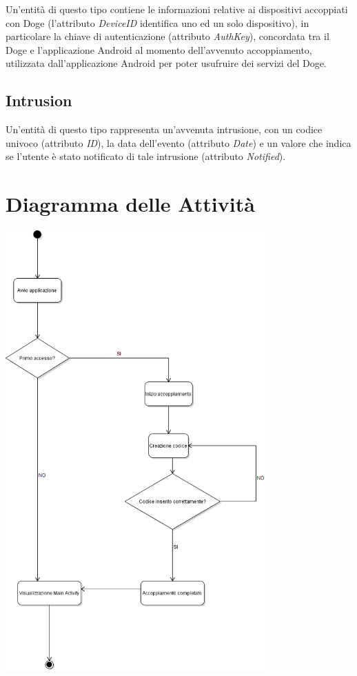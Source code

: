 \documentclass{article}
\begin{document}
Un'entità di questo tipo contiene le informazioni relative ai dispositivi accoppiati con Doge (l'attributo \textit{DeviceID} identifica uno ed un solo dispositivo), in particolare la chiave di autenticazione (attributo \textit{AuthKey}), concordata tra il Doge e l'applicazione Android al momento dell'avvenuto accoppiamento, utilizzata dall'applicazione Android per poter usufruire dei servizi del Doge.

\subsection{Intrusion}

Un'entità di questo tipo rappresenta un'avvenuta intrusione, con un codice univoco (attributo \textit{ID}), la data dell'evento (attributo \textit{Date}) e un valore che indica se l'utente è stato notificato di tale intrusione (attributo \textit{Notified}).

\section{Diagramma delle Attività}

\begin{center}
\includegraphics[width=10cm]{Primo_avvio_Activity.png}
\end{center}
\end{document}

